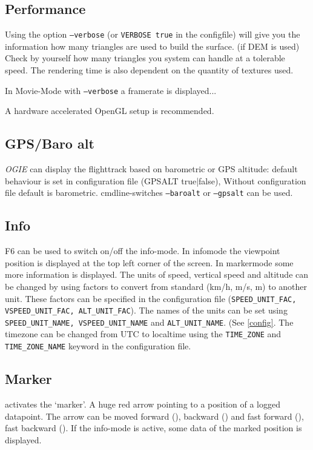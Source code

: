 \subsection{Performance}

Using the option \texttt{--verbose} (or \texttt{VERBOSE true}  in the configfile) will give you
the information how many triangles are used to build the surface. (if DEM is
used) Check by yourself how many triangles you system can handle at a tolerable
speed. The rendering time is also dependent on the quantity of textures used.

In Movie-Mode  with \texttt{--verbose} a framerate is displayed...

A hardware accelerated OpenGL setup is recommended.





\subsection{GPS/Baro alt}

\emph{OGIE} can display the flighttrack based on barometric or GPS altitude:
default behaviour is set in configuration file (GPSALT true|false),
Without configuration file default is barometric.
cmdline-switches \texttt{--baroalt} or \texttt{--gpsalt} can be used.


\subsection{Info}
\label{info}
F6 can be used to switch on/off the info-mode. In infomode the viewpoint position is displayed
at the top left corner of the screen.
In markermode some more information is displayed. The units of speed, vertical speed and altitude can be changed by using factors to convert from standard (km/h, m/s, m) to another unit. These factors can be specified in the configuration file (\texttt{SPEED\_UNIT\_FAC, VSPEED\_UNIT\_FAC, ALT\_UNIT\_FAC}). The names of the units can be set using \texttt{SPEED\_UNIT\_NAME, VSPEED\_UNIT\_NAME} and \texttt{ALT\_UNIT\_NAME}. (See \ref{config}. The timezone can be changed from UTC to localtime using the \texttt{TIME\_ZONE} and \texttt{TIME\_ZONE\_NAME} keyword in the configuration file.


\subsection{Marker}
\label{marker}
 activates the `marker'. A huge red arrow pointing to a position of a logged datapoint.
The arrow can be moved forward (), backward () and fast forward (),
fast backward (). If the info-mode is active, some data of the marked
position is displayed.


